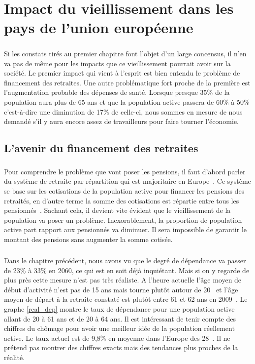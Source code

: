 \chapter{Impact du vieillissement dans les pays de l'union européenne}
\paragraph{}Si les constats tirés au premier chapitre font l'objet d'un large concensus, il n’en va pas de même pour les impacts que ce vieillissement pourrait avoir sur la société. Le premier impact qui vient à l’esprit est bien entendu le problème de financement des retraites. Une autre problématique fort proche de la première est l’augmentation probable des dépenses de santé. Lorsque presque 35\% de la population aura plus de 65 ans et que la population active passera de 60\% à 50\% c’est-à-dire une diminution de 17\% de celle-ci, nous sommes en mesure de nous demandé s'il y aura encore assez de travailleurs pour faire tourner l’économie.  

\section{L'avenir du financement des retraites}
\paragraph{}Pour comprendre le problème que vont poser les pensions, il faut d’abord parler du système de retraite par répartition qui est majoritaire en Europe~\citep{system_retraite}. Ce système se base sur les cotisations de la population active pour financer les pensions des retraités, en d’autre terme la somme des cotisations est répartie entre tous les pensionnés~\citep{retraite_repartition}. Sachant cela, il devient vite évident que le vieillissement de la population va poser un problème. Inexorablement, la proportion de population active part rapport aux pensionnés va diminuer. Il sera impossible de garantir le montant des pensions sans augmenter la somme cotisée.  

\paragraph{}Dans le chapitre précédent, nous avons vu que le degré de dépendance va passer de 23\% à 33\% en 2060, ce qui est en soit déjà inquiétant. Mais si on y regarde de plus près cette mesure n’est pas très réaliste. A l’heure actuelle l’âge moyen de début d’activité n’est pas de 15 ans mais tourne plutôt autour de 20~\citep[pp.27]{eul} et l’âge moyen de départ à la retraite constaté est plutôt entre 61 et 62 ans en 2009~\citep{eurocompar}. Le graphe \ref{real_dep} montre le taux de dépendance pour une population active allant de 20 à 61 ans et de 20 à 64 ans. Il est intéressant de tenir compte des chiffres du chômage pour avoir une meilleur idée de la population réellement active. Le taux actuel est de 9,8\% en moyenne dans l’Europe des 28~\citep{chaumage}. Il ne prétend pas montrer des chiffres exacts mais des tendances plus proches de la réalité. 



